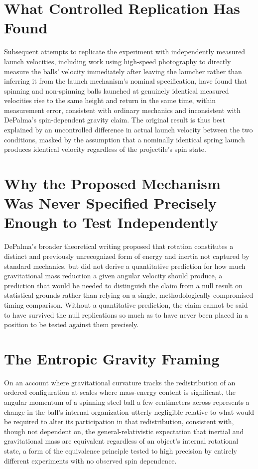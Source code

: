 \documentclass[11pt]{article}
\begin{document}
\section{What Controlled Replication Has Found}

Subsequent attempts to replicate the experiment with independently measured launch velocities, including work using high-speed photography to directly measure the balls' velocity immediately after leaving the launcher rather than inferring it from the launch mechanism's nominal specification, have found that spinning and non-spinning balls launched at genuinely identical measured velocities rise to the same height and return in the same time, within measurement error, consistent with ordinary mechanics and inconsistent with DePalma's spin-dependent gravity claim. The original result is thus best explained by an uncontrolled difference in actual launch velocity between the two conditions, masked by the assumption that a nominally identical spring launch produces identical velocity regardless of the projectile's spin state.

\section{Why the Proposed Mechanism Was Never Specified Precisely Enough to Test Independently}

DePalma's broader theoretical writing proposed that rotation constitutes a distinct and previously unrecognized form of energy and inertia not captured by standard mechanics, but did not derive a quantitative prediction for how much gravitational mass reduction a given angular velocity should produce, a prediction that would be needed to distinguish the claim from a null result on statistical grounds rather than relying on a single, methodologically compromised timing comparison. Without a quantitative prediction, the claim cannot be said to have survived the null replications so much as to have never been placed in a position to be tested against them precisely.

\section{The Entropic Gravity Framing}

On an account where gravitational curvature tracks the redistribution of an ordered configuration at scales where mass-energy content is significant, the angular momentum of a spinning steel ball a few centimeters across represents a change in the ball's internal organization utterly negligible relative to what would be required to alter its participation in that redistribution, consistent with, though not dependent on, the general-relativistic expectation that inertial and gravitational mass are equivalent regardless of an object's internal rotational state, a form of the equivalence principle tested to high precision by entirely different experiments with no observed spin dependence.
\end{document}
